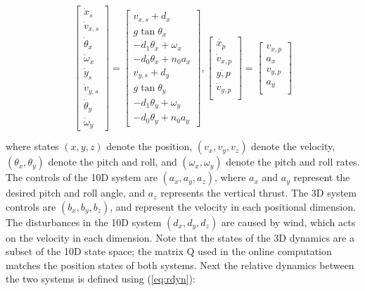 \begin{equation}
\label{eq:Quad8D}
\begin{aligned}
\begin{array}{c}
\left[
\begin{array}{c}
\dot x_s\\
\dot v_{x,s}\\
\dot \theta_x\\
\dot\omega_x\\
\dot y_s\\
\dot v_{y,s}\\
\dot\theta_y\\
\dot\omega_y
\end{array}
\right]
=
\left[
\begin{array}{c}
v_{x,s} + d_x\\
g \tan \theta_x\\
-d_1 \theta_x + \omega_x\\
-d_0 \theta_x + n_0 a_x\\
v_{y,s} + d_y\\
g \tan \theta_y \\
-d_1 \theta_y + \omega_y\\
-d_0 \theta_y + n_0 a_y
\end{array}
\right],
\left[
\begin{array}{c}
\dot{x_p}\\
\dot v_{x,p}\\
\dot{y,p}\\
\dot v_{y,p}\\
\end{array}
\right] 
=
\left[
\begin{array}{c}
v_{x,p}\\
a_x\\
v_{y,p}\\
a_y\\
\end{array}
\right]
\end{array}\\
\end{aligned}
\end{equation}
where states $(x, y, z)$ denote the position, $(v_x, v_y, v_z)$ denote the velocity, $(\theta_x, \theta_y)$ denote the pitch and roll, and $(\omega_x, \omega_y)$ denote the pitch and roll rates. The controls of the 10D system are $(a_x, a_y, a_z)$, where $a_x$ and $a_y$ represent the desired pitch and roll angle, and $a_z$ represents the vertical thrust. The 3D system controls are $(b_x, b_y, b_z)$, and represent the velocity in each positional dimension. The disturbances in the 10D system $(d_x, d_y, d_z)$ are caused by wind, which acts on the velocity in each dimension. Note that the states of the 3D dynamics are a subset of the 10D state space; the matrix Q used in the online computation matches the position states of both systems. Next the relative dynamics between the two systems is defined using (\ref{eq:rdyn}):

